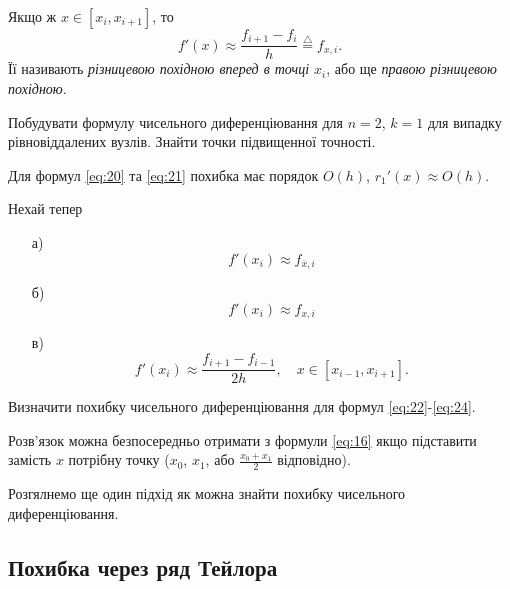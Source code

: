 Якщо ж $x \in [x_i, x_{i+1}]$, то
\begin{equation}
	\label{eq:21}
	f'(x) \approx \frac{f_{i + 1} - f_i}{h} \overset{\triangle}{=} f_{x, i}.
\end{equation}
Її називають \textit{різницевою похідною вперед в точці $x_i$}, або ще \textit{правою різницевою похідною}. 

\begin{problem}
	Побудувати формулу чисельного диференціювання для $n = 2$, $k = 1$ для випадку рівновіддалених вузлів. Знайти точки підвищенної точності.
\end{problem}

\begin{remark*}
	Для формул \eqref{eq:20} та \eqref{eq:21} похибка має порядок $O(h)$, $r_1'(x) \approx O(h)$.
\end{remark*}

\begin{problem}
	Нехай тепер
	\begin{enumerate}
		\item[а)] \begin{equation}
			\label{eq:22}
			f'(x_i) \approx f_{\bar x, i}
		\end{equation}
		\item[б)] \begin{equation}
			\label{eq:23}
			f'(x_i) \approx f_{x, i}
		\end{equation}
		\item[в)] \begin{equation}
			\label{eq:24}
			f'(x_i) \approx \frac{f_{i + 1} - f_{i - 1}}{2 h}, \quad x \in [x_{i - 1}, x_{i + 1}].
		\end{equation}
	\end{enumerate}

	Визначити похибку чисельного диференціювання для формул \eqref{eq:22}-\eqref{eq:24}.
\end{problem}
\begin{hint}
	Розв'язок можна безпосередньо отримати з формули \eqref{eq:16} якщо підставити замість $x$ потрібну точку ($x_0$, $x_1$, або $\frac{x_0+x_1}{2}$ відповідно).
\end{hint}

Розгялнемо ще один підхід як можна знайти похибку чисельного диференціювання.

\subsection{Похибка через ряд Тейлора}

